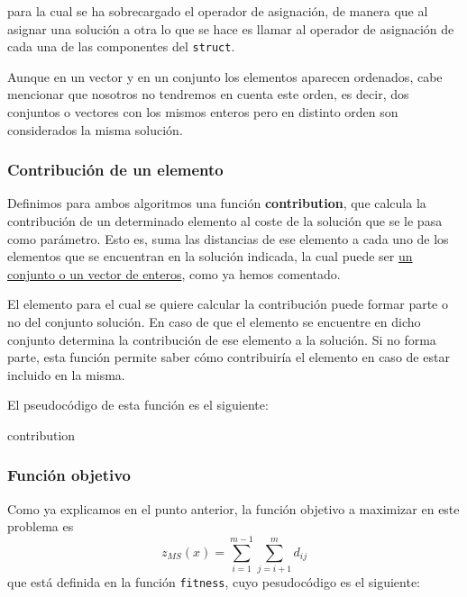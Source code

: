 \documentclass[10pt,a4paper]{article}
\begin{document}
	para la cual se ha sobrecargado el operador de asignación, de manera que al asignar una solución a otra lo que se hace es llamar al operador de asignación de cada una de las componentes del \lstinline|struct|.
	
	Aunque en un vector y en un conjunto los elementos aparecen ordenados, cabe mencionar que nosotros no tendremos en cuenta este orden, es decir, dos conjuntos o vectores con los mismos enteros pero en distinto orden son considerados la misma solución. 
	
	\subsubsection{Contribución de un elemento}
	
	Definimos para ambos algoritmos una función \textbf{contribution}, que calcula la contribución de un determinado elemento al coste de la solución que se le pasa como parámetro. Esto es, suma las distancias de ese elemento a cada uno de los elementos que se encuentran en la solución indicada, la cual puede ser \underline{un conjunto o un vector de enteros}, como ya hemos comentado. 
	
	El elemento para el cual se quiere calcular la contribución puede formar parte o no del conjunto solución. En caso de que el elemento se encuentre en dicho conjunto determina la contribución de ese elemento a la solución. Si no forma parte, esta función permite saber cómo contribuiría el elemento en caso de estar incluido en la misma. 
	
	El pseudocódigo de esta función es el siguiente:
		\begin{algorithm}
		\caption{\sc contribution}
	\end{algorithm}


\subsubsection{Función objetivo}
	
	Como ya explicamos en el punto anterior, la función objetivo a maximizar en este problema es 
	$$ z_{MS}(x) = \sum_{i=1}^{m-1} \sum_{j=i+1}^{m} d_{ij} $$ que está definida en la función \lstinline|fitness|, cuyo pesudocódigo es el siguiente:
		
\end{document}
